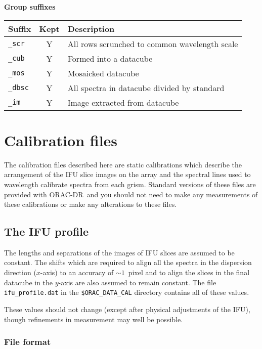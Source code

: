 \documentclass[twoside,11pt,nolof]{starlink}
\providecommand{\ORACDR}{{\footnotesize ORAC-DR}}
\begin{document}
\vspace{0.5cm}

\textbf{Group suffixes}

\vspace{0.2cm}

\begin{tabular}{l c l}
\hline
Suffix & Kept & Description \hspace{9cm} \\
\hline
\texttt{\_scr} & Y & All rows scrunched to common wavelength scale\\
\texttt{\_cub} & Y & Formed into a datacube\\
\texttt{\_mos} & Y & Mosaicked datacube\\
\texttt{\_dbsc} & Y & All spectra in datacube divided by standard\\
\texttt{\_im}  & Y & Image extracted from datacube\\
\hline
\end{tabular}


\section{Calibration files}

The calibration files described here are static calibrations which
describe the arrangement of the IFU slice images on the array and the
spectral lines used to wavelength calibrate spectra from each
grism. Standard versions of these files are provided with \ORACDR\ and
you should not need to make any measurements of these calibrations or
make any alterations to these files.

\subsection{The IFU profile}

The lengths and separations of the images of IFU slices are assumed to
be constant. The shifts which are required to align all the spectra in
the dispersion direction ($x$-axis) to an accuracy of $\sim 1$~pixel
and to align the slices in the final datacube in the $y$-axis are also
assumed to remain constant. The file \texttt{ifu\_profile.dat} in the
\texttt{\$ORAC\_DATA\_CAL} directory contains all of these values.

These values should not change (except after physical adjustments of
the IFU), though refinements in measurement may well be possible.

\subsubsection{File format}
\end{document}

